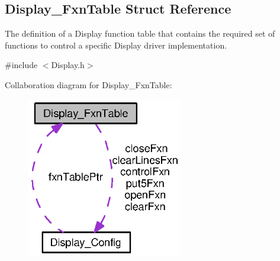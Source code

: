 \subsection{Display\+\_\+\+Fxn\+Table Struct Reference}
\label{struct_display___fxn_table}


The definition of a Display function table that contains the required set of functions to control a specific Display driver implementation.  




{\ttfamily \#include $<$Display.\+h$>$}



Collaboration diagram for Display\+\_\+\+Fxn\+Table\+:
\nopagebreak
\begin{figure}[H]
\begin{center}
\leavevmode
\includegraphics[width=193pt]{struct_display___fxn_table__coll__graph}
\end{center}
\end{figure}
